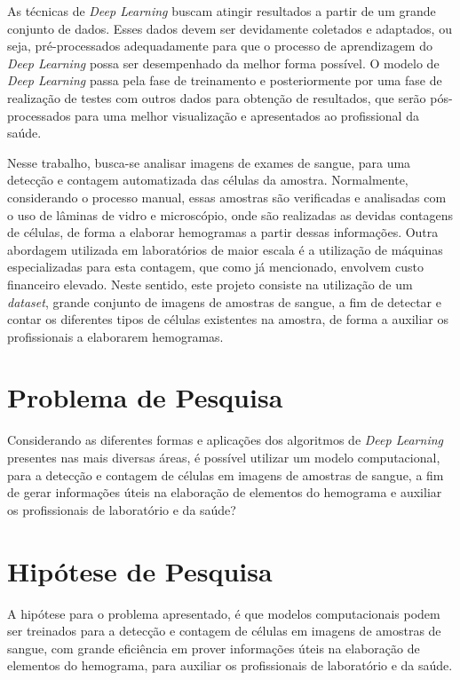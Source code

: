 As técnicas de \emph{Deep Learning} buscam atingir resultados a partir de um grande conjunto de dados. Esses dados devem ser devidamente coletados e adaptados, ou seja, pré-processados adequadamente para que o processo de aprendizagem do \emph{Deep Learning} possa ser desempenhado da melhor forma possível. O modelo de \emph{Deep Learning} passa pela fase de treinamento e posteriormente por uma fase de realização de testes com outros dados para obtenção de resultados, que serão pós-processados para uma melhor visualização e apresentados ao profissional da saúde.

Nesse trabalho, busca-se analisar imagens de exames de sangue, para uma detecção e contagem automatizada das células da amostra. Normalmente, considerando o processo manual, essas amostras são verificadas e analisadas com o uso de lâminas de vidro e microscópio, onde são realizadas as devidas contagens de células, de forma a elaborar hemogramas a partir dessas informações. Outra abordagem utilizada em laboratórios de maior escala é a utilização de máquinas especializadas para esta contagem, que como já mencionado, envolvem custo financeiro elevado. Neste sentido, este projeto consiste na utilização de um \emph{dataset}, grande conjunto de imagens de amostras de sangue, a fim de detectar e contar os diferentes tipos de células existentes na amostra, de forma a auxiliar os profissionais a elaborarem hemogramas.

\section{Problema de Pesquisa}
\label{sec:problema}

Considerando as diferentes formas e aplicações dos algoritmos de \emph{Deep Learning} presentes nas mais diversas áreas, é possível utilizar um modelo computacional, para a detecção e contagem de células em imagens de amostras de sangue, a fim de gerar informações úteis na elaboração de elementos do hemograma e auxiliar os profissionais de laboratório e da saúde?

\section{Hipótese de Pesquisa}
\label{sec:hipotese}
A hipótese para o problema apresentado, é que modelos computacionais podem ser treinados para a detecção e contagem de células em imagens de amostras de sangue, com grande eficiência em prover informações úteis na elaboração de elementos do hemograma, para auxiliar os profissionais de laboratório e da saúde.

